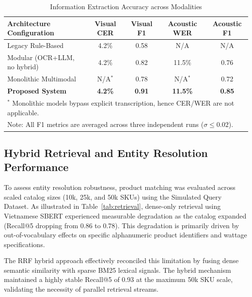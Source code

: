 \begin{table}[htbp]
    \centering
    \caption{Information Extraction Accuracy across Modalities}
    \label{tab:extraction}
    \renewcommand{\arraystretch}{1.2}
    \begin{tabular}{l cccc}
        \hline
        \textbf{Architecture Configuration} & \textbf{Visual CER} & \textbf{Visual F1} & \textbf{Acoustic WER} & \textbf{Acoustic F1} \\
        \hline
        Legacy Rule-Based & 4.2\% & 0.58 & N/A & N/A \\
        Modular (OCR+LLM, no hybrid) & 4.2\% & 0.82 & 11.5\% & 0.76 \\
        Monolithic Multimodal & N/A$^*$ & 0.78 & N/A$^*$ & 0.72 \\
        \textbf{Proposed System} & \textbf{4.2\%} & \textbf{0.91} & \textbf{11.5\%} & \textbf{0.85} \\
        \hline
        \multicolumn{5}{l}{\footnotesize $^*$ Monolithic models bypass explicit transcription, hence CER/WER are not applicable.} \\
        \multicolumn{5}{l}{\footnotesize Note: All F1 metrics are averaged across three independent runs ($\sigma \le 0.02$).}
    \end{tabular}
\end{table}

\subsection{Hybrid Retrieval and Entity Resolution Performance}
To assess entity resolution robustness, product matching was evaluated across scaled catalog sizes (10k, 25k, and 50k SKUs) using the Simulated Query Dataset. As illustrated in Table~\ref{tab:retrieval}, dense-only retrieval using Vietnamese SBERT experienced measurable degradation as the catalog expanded (Recall@5 dropping from 0.86 to 0.78). This degradation is primarily driven by out-of-vocabulary effects on specific alphanumeric product identifiers and wattage specifications. 

The RRF hybrid approach effectively reconciled this limitation by fusing dense semantic similarity with sparse BM25 lexical signals. The hybrid mechanism maintained a highly stable Recall@5 of 0.93 at the maximum 50k SKU scale, validating the necessity of parallel retrieval streams. 

